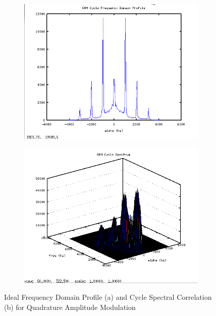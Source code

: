 \begin{figure}
\centering
\begin{subfigure}{.49\textwidth}
\centering
\includegraphics[width=\linewidth]{../img/Report_QAM_Ia_Ideal.png}
  \caption{ }
\end{subfigure}
\begin{subfigure}{.49\textwidth}
  \centering
  \includegraphics[width=\linewidth]{../img/Report_QAM_Sxa_Ideal.png}
  \caption{ }
\end{subfigure}
\caption{Ideal Frequency Domain Profile (a) and Cycle Spectral Correlation (b)
for Quadrature Amplitude Modulation}
\label{fig:IdealQAMCyclo}
\end{figure}

